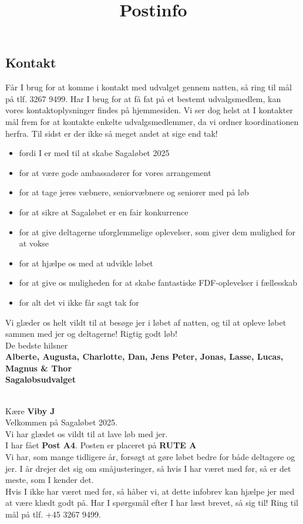 \subsection{Kontakt}
Får I brug for at komme i kontakt med udvalget gennem natten, så ring til mål på tlf. 3267 9499. Har I brug for at få fat på et bestemt udvalgsmedlem, kan vores kontaktoplysninger findes på hjemmesiden. Vi ser dog helst at I kontakter mål frem for at kontakte enkelte udvalgsmedlemmer, da vi ordner koordinationen herfra.
\newline
Til sidst er der ikke så meget andet at sige end tak!\begin{itemize}
  \item fordi I er med til at skabe Sagaløbet 2025
  \item for at være gode ambassadører for vores arrangement
  \item for at tage jeres væbnere, seniorvæbnere og seniorer med på løb
  \item for at sikre at Sagaløbet er en fair konkurrence
  \item for at give deltagerne uforglemmelige oplevelser, som giver dem mulighed for at vokse
  \item for at hjælpe os med at udvikle løbet
  \item for at give os muligheden for at skabe fantastiske FDF-oplevelser i fællesskab
  \item for alt det vi ikke får sagt tak for
\end{itemize}
Vi glæder os helt vildt til at besøge jer i løbet af natten, og til at opleve løbet sammen med jer og deltagerne!
\newline
Rigtig godt løb!\\
\newline
\textcolor{søblå}{De bedste hilsner}\\
\textcolor{natblå}{\textbf{Alberte, Augusta, Charlotte, Dan, Jens Peter, Jonas, Lasse, Lucas, Magnus \& Thor}}\\
\textcolor{natblå}{\textbf{Sagaløbsudvalget}}\\
\newpage
\title{Postinfo}\\
Kære \textbf{Viby J}\\
\newline
Velkommen på Sagaløbet 2025.\\
Vi har glædet os vildt til at lave løb med jer.\\
\newline
I har fået \textbf{Post A4}. Posten er placeret på \textbf{RUTE A}\\
Vi har, som mange tidligere år, forsøgt at gøre løbet bedre for både deltagere og jer. I år drejer det sig om småjusteringer, så hvis I har været med før, så er det meste, som I kender det.\\
\newline
Hvis I ikke har været med før, så håber vi, at dette infobrev kan hjælpe jer med at være klædt godt på. Har I spørgsmål efter I har læst brevet, så sig til! Ring til mål på tlf. +45 3267 9499.
